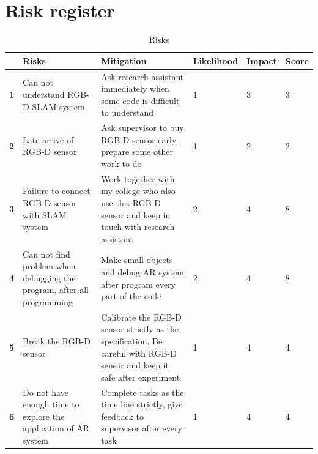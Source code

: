 \documentclass[a4paper,11pt]{article}
\begin{document}
\section{Risk register}


\begin{table}[!htp]
\caption{\label{tab:widgets}Risks}
\centering
\begin{tabular}{ | p{0.5cm}| p{4.5cm}|p{4cm} | p{1.9cm}| p{1.2cm} | p{1.2cm} | }

\hline
 &\textbf{Risks}&\textbf{Mitigation}&\textbf{Likelihood}&\textbf{Impact}&\textbf{Score}\\ 
\hline
\textbf{1}&Can not understand RGB-D SLAM system&Ask research assistant immediately when some code is difficult to understand&1&3&3\\ 
\hline
\textbf{2}&Late arrive of RGB-D sensor&Ask supervisor to buy RGB-D sensor early, prepare some other work to do&1&2&2\\ 
\hline
\textbf{3}&Failure to connect RGB-D sensor with SLAM system&Work together with my college who also use this RGB-D sensor and keep in touch with research assistant&2&4&8\\ 
\hline
\textbf{4}&Can not find problem when debugging the program, after all programming&Make small objects and debug AR system after program every part of the code&2&4&8\\ 
\hline
\textbf{5}&Break the RGB-D sensor&Calibrate the RGB-D sensor strictly as the specification. Be careful with RGB-D sensor and keep it safe after experiment &1&4&4\\ 
\hline
\textbf{6}&Do not have enough time to explore the application of AR system&Complete tasks as the time line strictly, give feedback to supervisor after every task &1&4&4\\ 
\hline
\end{tabular}
\end{table}
\end{document}
